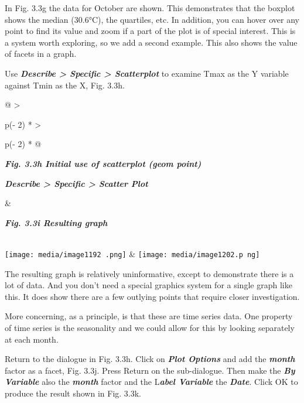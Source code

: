 \documentclass[
  letterpaper,
  DIV=11,
  numbers=noendperiod]{scrreprt}
\begin{document}
In Fig. 3.3g the data for October are shown. This demonstrates that the
boxplot shows the median (30.6°C), the quartiles, etc. In addition, you
can hover over any point to find its value and zoom if a part of the
plot is of special interest. This is a system worth exploring, so we add
a second example. This also shows the value of facets in a graph.

Use \textbf{\emph{Describe \textgreater{} Specific \textgreater{}
Scatterplot}} to examine Tmax as the Y variable against Tmin as the X,
Fig. 3.3h.

\begin{longtable}[]{@{}
  >{\raggedright\arraybackslash}p{(\columnwidth - 2\tabcolsep) * }
  >{\raggedright\arraybackslash}p{(\columnwidth - 2\tabcolsep) * }@{}}
\toprule\noalign{}
\begin{minipage}[b]{\linewidth}\raggedright
\textbf{\emph{Fig. 3.3h Initial use of scatterplot (geom point)}}

\textbf{\emph{Describe \textgreater{} Specific \textgreater{} Scatter
Plot}}
\end{minipage} & \begin{minipage}[b]{\linewidth}\raggedright
\textbf{\emph{Fig. 3.3i Resulting graph}}
\end{minipage} \\
\midrule\noalign{}
\endhead
\bottomrule\noalign{}
\endlastfoot
\texttt{[image: media/image1192 .png]}
&
\texttt{[image: media/image1202.p ng]} \\
\end{longtable}

The resulting graph is relatively uninformative, except to demonstrate
there is a lot of data. And you don't need a special graphics system for
a single graph like this. It does show there are a few outlying points
that require closer investigation.

More concerning, as a principle, is that these are time series data. One
property of time series is the seasonality and we could allow for this
by looking separately at each month.

Return to the dialogue in Fig. 3.3h. Click on \textbf{\emph{Plot
Options}} and add the \textbf{\emph{month}} factor as a facet, Fig.
3.3j. Press Return on the sub-dialogue. Then make the \textbf{\emph{By
Variable}} also the \textbf{\emph{month}} factor and the
L\textbf{\emph{abel Variable}} the \textbf{\emph{Date}}. Click OK to
produce the result shown in Fig. 3.3k.
\end{document}

